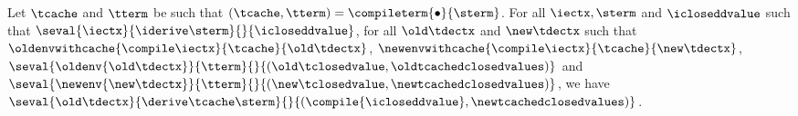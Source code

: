 \begin{theorem}
  \label{thm:soundness-compiled-changesfinal}
  Let $\tcache$ and $\tterm$ be such that 
  $(\tcache, \tterm) = \compileterm{\bullet}{\sterm}$.
  For all $\iectx, \sterm$ and $\icloseddvalue$ such that
  $\seval{\iectx}{\iderive\sterm}{}{\icloseddvalue}$,
  for all $\old\tdectx$ and $\new\tdectx$ such that
  $\oldenvwithcache{\compile\iectx}{\tcache}{\old\tdectx}$,
  $\newenvwithcache{\compile\iectx}{\tcache}{\new\tdectx}$,
  $\seval{\oldenv{\old\tdectx}}{\tterm}{}{(\old\tclosedvalue, \oldtcachedclosedvalues)}$ and
  $\seval{\newenv{\new\tdectx}}{\tterm}{}{(\new\tclosedvalue, \newtcachedclosedvalues)}$,
  we have
  $
  \seval{\old\tdectx}{\derive\tcache\sterm}{}{(\compile{\icloseddvalue}, \newtcachedclosedvalues)}
  $.
\end{theorem}
